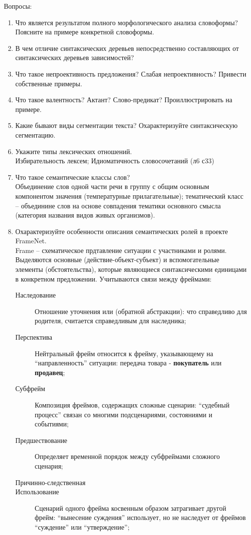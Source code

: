 \documentclass[a4paper]{article}
\newcommand{\eng}[1]{\foreignlanguage{english}{#1}}
\begin{document}
Вопросы:
\begin{enumerate}
	\item Что является результатом полного морфологического анализа словоформы? Поясните на примере конкретной словоформы.
	\item В чем отличие синтаксических деревьев непосредственно составляющих от синтаксических деревьев зависимостей?
	\item Что такое непроективность предложения? Слабая непроективность? Привести собственные примеры.
	\item Что такое валентность? Актант? Слово-предикат? Проиллюстрировать на примере.
	\item Какие бывают виды сегментации текста? Охарактеризуйте синтаксическую сегментацию.
	\item Укажите типы лексических отношений.\hfill\\
	Избирательность лексем; Идиоматичность словосочетаний (л6 с33)

	\item Что такое семантические классы слов?\hfill\\
	Объединение слов одной части речи в группу с общим основным компонентом значения (температурные прилагательные); тематический класс -- объединине слов на основе совпадения тематики основного смысла (категория названия видов живых организмов).

	\item Охарактеризуйте особенности описания семантических ролей в проекте FrameNet.\hfill\\
	\eng{Frame} -- схематическое прдтавление ситуации с участниками и ролями. Выделяются основные (действие-объект-субъект) и вспомогательные элементы (обстоятельства), которые являющиеся синтаксическими единицами в конкретном предложении. Учитываются связи между фреймами: \begin{description}
		\item [Наследование] Отношение уточнения или (обратной абстракции): что справедливо для родителя, считается справедливым для наследника;
		\item [Перспектива] Нейтральный фрейм относится к фрейму, указывающему на ``направленность'' ситуации: передача товара - \textbf{покупатель} или \textbf{продавец};
		\item [Субфрейм] Композиция фреймов, содержащих сложные сценарии: ``судебный процесс'' связан со многими подсценариями, состояниями и событиями;
		\item [Предшествование] Определяет временной порядок между субфреймами сложного сценария;
		\item [Причинно-следственная]
		\item [Использование] Сценарий одного фрейма косвенным образом затрагивает другой фрейм: ``вынесение суждения'' использует, но не наследует от фреймов ``суждение'' или ``утверждение'';
	\end{description}


\end{enumerate}
\end{document}
